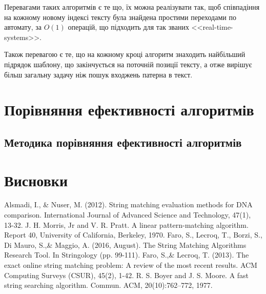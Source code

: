 \documentclass[a4paper,14pt]{extarticle} %
\begin{document}
Перевагами таких алгоритмів є те що, їх можна реалізувати так, щоб співпадіння на кожному новому індексі тексту була знайдена  простими переходами по автомату, за $O(1)$ операцій, що підходить для так званих <<real-time-systems>>.

Також перевагою є те, що на кожному кроці алгоритм знаходить найбільший підрядок шаблону, що закінчується на поточній позиції тексту, а отже вирішує більш загальну задачу ніж пошук входжень патерна в текст.
	\newpage
    \section{Порівняння ефективності алгоритмів}

	\subsection{Методика порівняння ефективності алгоритмів}

    \newpage
    \section{Висновки}

    \newpage
    
    \begin{thebibliography}{9}
		Alsmadi, I., \& Nuser, M. (2012). String matching evaluation methods for DNA comparison. International Journal of Advanced Science and Technology, 47(1), 13-32.
		J. H. Morris, Jr and V. R. Pratt. A linear pattern-matching algorithm. Report 40, University of California, Berkeley, 1970.
		Faro, S., Lecroq, T., Borzi, S., Di Mauro, S.,\& Maggio, A. (2016, August). The String Matching Algorithms Research Tool. In Stringology (pp. 99-111).
		Faro, S.,\& Lecroq, T. (2013). The exact online string matching problem: A review of the most recent results. ACM Computing Surveys (CSUR), 45(2), 1-42.
		R. S. Boyer and J. S. Moore. A fast string searching algorithm. Commun.
ACM, 20(10):762–772, 1977.
    \end{thebibliography}
    
\end{document}
